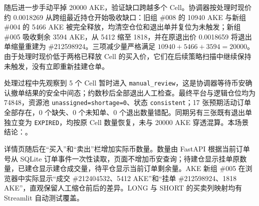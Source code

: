 随后进一步手动平掉 20000 AKE，验证缺口跨越多个 Cell。协调器按处理时现价约 0.0018269 从跨组最近持仓开始吸收缺口：旧组 \#008 的 10940 AKE 与新组 \#004 的 5466 AKE 被完全释放，均清空仓位和退出单并复位为未触发；新组 \#005 吸收剩余 3594 AKE，从 5412 缩至 1818，并在原退出价 0.0018659 将退出单缩量重建为 \#212598924。三项减少量严格满足 $10940+5466+3594=20000$。由于处理时现价低于两格已释放 Cell 的买入价，它们在后续策略扫描中继续保持未触发，没有立即重新挂建仓单。

处理过程中先观察到 5 个 Cell 暂时进入 \texttt{manual\_review}，这是协调器等待币安确认撤单结果的安全中间态；约数秒后全部退出人工检查。最终平台与逻辑仓位均为 74848，资源池 \texttt{unassigned=shortage=0}、状态 \texttt{consistent}；17 张预期活动订单全部存在，0 个缺失、0 个未知单、0 个退出数量错配。同期另有三张既有退出单独立变为 \texttt{EXPIRED}，均按原 Cell 数量恢复，未与 20000 AKE 穿透混算。本场景结论：\StatusPass。

详情页随后在“买入”和“卖出”栏增加实际币数量。数量由 FastAPI 根据当前订单号从 SQLite 订单事件一次性读取，页面不增加币安查询；待建仓显示挂单原数量，已建仓显示建仓成交量，待平仓显示当前订单剩余量。AKE 新组 \#005 在浏览器中实际显示“成交 \#212404532、5412 AKE”和“挂单 \#212598924、1818 AKE”，直观保留人工缩仓前后的差异。LONG 与 SHORT 的买卖列映射均有 Streamlit 自动测试覆盖。
